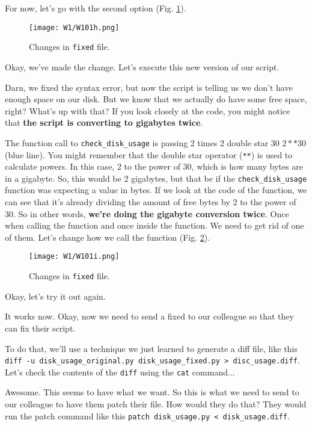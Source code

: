	For now, let's go with the second option (Fig. \ref{W101h}).
	
	\begin{figure} 
		\caption{Changes in \texttt{fixed} file.}
		\centering
		\texttt{[image: W1/W101h.png]}
		\label{W101h}
	\end{figure}
	
	Okay, we've made the change. Let's execute this new version of our script.
	
	Darn, we fixed the syntax error, but now the script is telling us we don't have enough space on our disk. But we know that we actually do have some free space, right? What's up with that? If you look closely at the code, you might notice that \textbf{the script is converting to gigabytes twice}.
	
	The function call to \verb|check_disk_usage| is passing 2 times 2 double star 30 $2**30$ (blue line). You might remember that the double star operator (\verb|**|) is used to calculate powers. In this case, 2 to the power of 30, which is how many bytes are in a gigabyte. So, this would be 2 gigabytes, but that be if the \verb|check_disk_usage| function was expecting a value in bytes. If we look at the code of the function, we can see that it's already dividing the amount of free bytes by 2 to the power of 30. So in other words, \textbf{we're doing the gigabyte conversion twice}. Once when calling the function and once inside the function. We need to get rid of one of them. Let's change how we call the function (Fig. \ref{W101i}).
	
	\begin{figure} 
		\caption{Changes in \texttt{fixed} file.}
		\centering
		\texttt{[image: W1/W101i.png]}
		\label{W101i}
	\end{figure}

	Okay, let's try it out again.
	
	It works now. Okay, now we need to send a fixed to our colleague so that they can fix their script.
	
	To do that, we'll use a technique we just learned to generate a diff file, like this \verb|diff -u disk_usage_original.py disk_usage_fixed.py > disc_usage.diff|. Let's check the contents of the \texttt{diff} using the \texttt{cat} command... 
	
	Awesome. This seems to have what we want. So this is what we need to send to our colleague to have them patch their file. How would they do that? They would run the patch command like this \verb|patch disk_usage.py < disk_usage.diff|.
	

